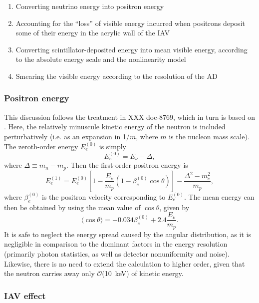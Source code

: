 \documentclass[../thesis.tex]{subfiles}
\begin{document}
\begin{enumerate}
\item Converting neutrino energy into positron energy
\item Accounting for the ``loss'' of visible energy incurred when positrons
  deposit some of their energy in the acrylic wall of the IAV
\item Converting scintillator-deposited energy into mean visible energy,
  according to the absolute energy scale and the nonlinearity model
\item Smearing the visible energy according to the resolution of the AD
\end{enumerate}

\subsubsection{Positron energy}

This discussion follows the treatment in XXX doc-8769, which in turn is based on
\cite{Vogel_1999}. Here, the relatively minuscule kinetic energy of the neutron
is included perturbatively (i.e. as an expansion in 1/$m$, where $m$ is the
nucleon mass scale). The zeroth-order energy $E_e^{(0)}$ is simply
\begin{equation*}
  E_e^{(0)} = E_\nu - \Delta,
\end{equation*}
where $\Delta \equiv m_n - m_p$. Then the first-order positron energy is
\begin{equation*}
  E_e^{(1)} = E_e^{(0)} \left[ 1 - \frac{E_\nu}{m_p}(1 - \beta_e^{(0)}\cos\theta) \right]
  - \frac{\Delta^2 - m_e^2}{m_p},
\end{equation*}
where $\beta_e^{(0)}$ is the positron velocity corresponding to $E_e^{(0)}$. The
mean energy can then be obtained by using the mean value of $\cos \theta$, given
by \cite{Vogel_1999}
\begin{equation*}
  \langle \cos \theta \rangle = -0.034 \beta_e^{(0)} + 2.4 \frac{E_\nu}{m_p}.
\end{equation*}
It is safe to neglect the energy spread caused by the angular distribution, as
it is negligible in comparison to the dominant factors in the energy resolution
(primarily photon statistics, as well as detector nonuniformity and
noise). Likewise, there is no need to extend the calculation to higher order,
given that the neutron carries away only $\mathcal{O}$(10~keV) of kinetic
energy.

\subsubsection{IAV effect}
\end{document}
